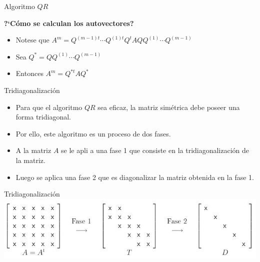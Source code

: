 \documentclass[11pt]{beamer}
\begin{document}
\begin{frame}{Algoritmo $QR$}

{\bf ?`C\'omo se calculan los autovectores?}
\begin{itemize}
   \item<2-> Notese que $A^m = Q^{(m-1)t}\cdots Q^{(1)t}Q^tAQQ^{(1)}\cdots Q^{(m-1)}$
   \item<3-> Sea $Q^* = QQ^{(1)}\cdots Q^{(m-1)}$
   \item<4-> Entonces $A^m = Q^{*t}AQ^*$
\end{itemize}



\end{frame}
\begin{frame}{Tridiagonalizaci\'on}
\begin{itemize}
   \item<1-> Para que el algoritmo $QR$ sea eficaz, la matriz sim\'etrica debe poseer una forma 
tridiagonal.
\item<2-> Por ello, este algoritmo es un proceso de dos fases.
\item<3-> A la matriz $A$ se le apli
a una fase 1 que consiste en la tridiagonalizaci\'on de la 
matriz.
\item<4-> Luego se aplica una fase 2 que es diagonalizar la matriz obtenida en la fase 1.
\end{itemize}
\end{frame}
\begin{frame}{Tridiagonalizaci\'on}
\centering
\includegraphics[scale=0.6]{trid.jpg}
\end{frame}
\end{document}

